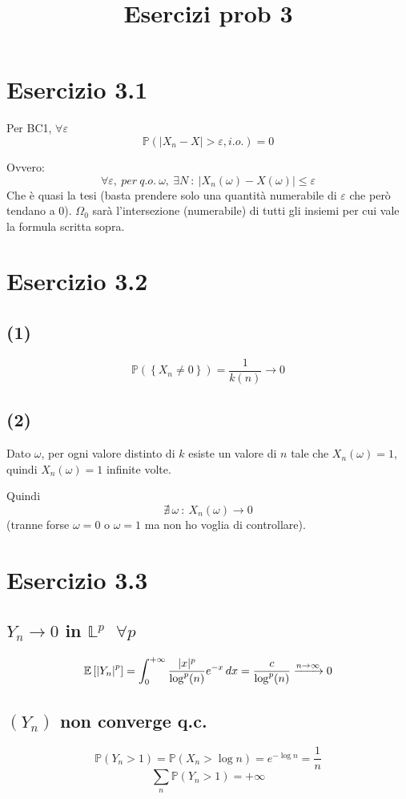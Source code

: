 \documentclass{article}
\title{Esercizi prob 3}
\newcommand{\myrightarrow}[1]{\xrightarrow{\makebox[2em][c]{$\scriptstyle#1$}}}
\begin{document}
\maketitle
\section{Esercizio 3.1}
Per BC1, $\forall  \varepsilon $ 
\[
	\mathbb{P}\left(|X_n - X| >\varepsilon , i.o.\right) = 0
\]

Ovvero: 
\[
	\forall \varepsilon , \ per\ q.o.\ \omega ,\  \exists N\ :\ |X_n(\omega ) - X(\omega )| \leq \varepsilon 
\]
Che è quasi la tesi (basta prendere solo una quantità numerabile di $\varepsilon $ che però tendano a $0$). $\Omega _0$ sarà l'intersezione (numerabile) di tutti gli insiemi per cui vale la formula scritta sopra.

\section{Esercizio 3.2}
\subsection{(1)}
\[
	\mathbb{P}\left(\left\{X_n \neq  0\right\}\right) = \frac{1}{k(n)} \rightarrow 0
\]

\subsection{(2)}
Dato $\omega $, per ogni valore distinto di $k$ esiste un valore di $n$ tale che $X_n(\omega ) =1$, quindi $X_n\left(\omega \right) = 1$ infinite volte.

Quindi
\[
	\nexists\, \omega \ : \ X_n(\omega ) \rightarrow  0 
\]
(tranne forse $\omega =0$ o $\omega =1$ ma non ho voglia di controllare).


\section{Esercizio 3.3}
\subsection{$Y_n \rightarrow  0$ in $\mathbb{L}^p\ \ \ \forall p$}
\[
	\mathbb{E}\left[\left|Y_n\right|^p\right]=\int_{0}^{+\infty }\frac{|x|^p}{\log^p(n)}e^{-x}\,dx = \frac{c}{\log^p(n)} \myrightarrow{n\rightarrow \infty } 0
\]

\subsection{$\left(Y_n\right)$ non converge q.c.}
\[
	\mathbb{P}\left(Y_n>1\right) = \mathbb{P}\left(X_n > \log n\right) = e^{-\log n} = \frac{1}{n}
\]
\[
	\sum_n \mathbb{P}\left(Y_n>1\right) = +\infty 
\]
\end{document}
